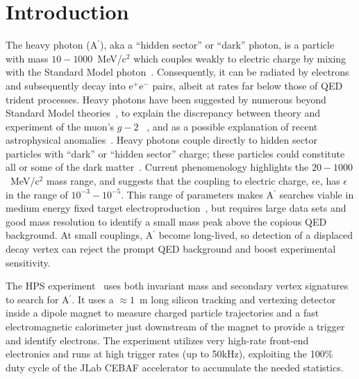 \documentclass[final,3p,times,twocolumn]{elsarticle}
\newcommand{\Aprime}{A\ensuremath{^\prime}}
\newcommand{\ee}{e$^+$e$^-$}
\begin{document}
 \linenumbers
 
\clearpage
\tableofcontents
\clearpage
\newpage
\newpage


\section{Introduction}
\label{introduction}
The heavy photon (\Aprime{}), aka a ``hidden sector'' or ``dark'' photon, is a particle with mass 
$10-1000$~MeV/c$^{2}$ which couples weakly to electric charge by mixing with the Standard Model 
photon~\cite{Holdom:1985ag}. Consequently, it can be radiated by electrons and subsequently decay 
into \ee{} pairs, albeit at rates far below those of QED trident processes. Heavy photons have been 
suggested by numerous beyond Standard Model theories~\cite{Essig:2013lka}, to explain the 
discrepancy 
between theory and experiment of the muon's $g-2$ ~\cite{Pospelov:2008zw}, and as a possible 
explanation of recent astrophysical 
anomalies~\cite{Adriani:2008zr,FermiLAT:2011ab,Aguilar:2013qda}.  Heavy photons  couple directly to  
hidden sector particles with ``dark'' or ``hidden sector'' charge; these particles
could constitute all or some of the dark matter~\cite{ArkaniHamed:2008qn}. 
Current phenomenology highlights the $20-1000$~MeV/c$^{2}$ mass range, and 
suggests that  the coupling to electric charge, $\epsilon$e, has $\epsilon$ in the range of 
$10^{-3} -10^{-5}$. This range of parameters makes \Aprime{} searches viable in 
medium energy fixed target electroproduction~\cite{Bjorken:2009mm}, but requires large data sets and 
good mass resolution to identify a small mass peak above the copious QED background. At small 
couplings, \Aprime{} become long-lived, so detection of a displaced decay vertex can reject the prompt 
QED background and boost experimental sensitivity.  

The HPS experiment~\cite{HPS_proposal_2010} uses both invariant mass and secondary
vertex signatures to search for \Aprime{}. It uses  a $\approx 1$~m long silicon tracking and vertexing 
detector
inside a dipole magnet to measure charged particle trajectories and a fast electromagnetic calorimeter 
just downstream of the magnet to provide a trigger and identify electrons. The experiment utilizes very 
high-rate front-end electronics and runs at high trigger rates (up to 50kHz), exploiting the 100\% duty 
cycle of the JLab CEBAF accelerator to accumulate the needed statistics. 
\end{document}
